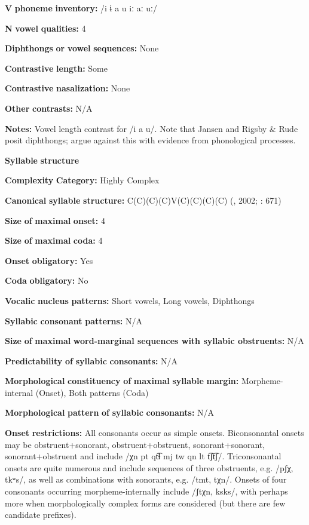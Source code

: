 \begin{styleBody}
\textbf{V} \textbf{phoneme} \textbf{inventory:} /i ɨ a u iː aː uː/

\textbf{N} \textbf{vowel} \textbf{qualities:} 4

\textbf{Diphthongs} \textbf{or} \textbf{vowel} \textbf{sequences:} None

\textbf{Contrastive} \textbf{length:} Some

\textbf{Contrastive} \textbf{nasalization:} None

\textbf{Other} \textbf{contrasts:} N/A

\textbf{Notes:} Vowel length contrast for /i a u/. Note that Jansen and Rigsby \& Rude posit diphthongs; \citet{HargusBeavert2006} argue against this with evidence from phonological processes.

\textbf{Syllable} \textbf{structure}

\textbf{Complexity} \textbf{Category:} Highly Complex

\textbf{Canonical} \textbf{syllable} \textbf{structure:} C(C)(C)(C)V(C)(C)(C)(C) (\citealt{HargusBeavert2006}, 2002; \citealt{RigsbyRude1996}: 671)

\textbf{Size} \textbf{of} \textbf{maximal} \textbf{onset:} 4

\textbf{Size} \textbf{of} \textbf{maximal} \textbf{coda:} 4

\textbf{Onset} \textbf{obligatory:} Yes

\textbf{Coda} \textbf{obligatory:} No

\textbf{Vocalic} \textbf{nucleus} \textbf{patterns:} Short vowels, Long vowels, Diphthongs

\textbf{Syllabic} \textbf{consonant} \textbf{patterns:} N/A

\textbf{Size} \textbf{of} \textbf{maximal} \textbf{word{}-marginal sequences with syllabic obstruents:} N/A

\textbf{Predictability} \textbf{of} \textbf{syllabic} \textbf{consonants:} N/A

\textbf{Morphological} \textbf{constituency} \textbf{of} \textbf{maximal} \textbf{syllable} \textbf{margin:} Morpheme-internal (Onset), Both patterns (Coda)

\textbf{Morphological} \textbf{pattern} \textbf{of} \textbf{syllabic} \textbf{consonants:} N/A

\textbf{Onset} \textbf{restrictions:} All consonants occur as simple onsets. Biconsonantal onsets may be obstruent+sonorant, obstruent+obstruent, sonorant+sonorant, sonorant+obstruent and include /χn pt qt͡ɬ mj tw qn lt t͡ʃt͡ʃ/. Triconsonantal onsets are quite numerous and include sequences of three obstruents, e.g. /pʃχ, tkʷs/, as well as combinations with sonorants, e.g. /tmt, tχn/. Onsets of four consonants occurring morpheme-internally include /ʃtχn, ksks/, with perhaps more when morphologically complex forms are considered (but there are few candidate prefixes).


\end{styleBody}
